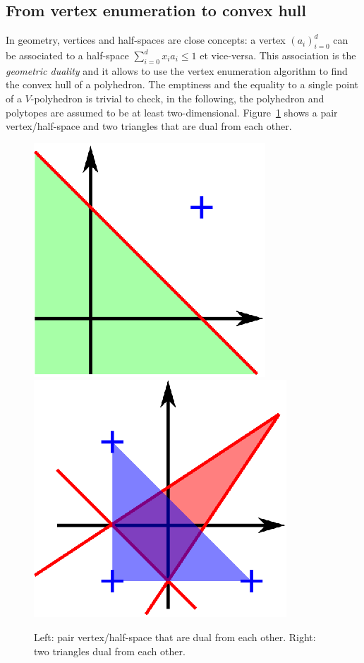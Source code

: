 \subsection{From vertex enumeration to convex hull}


In geometry, vertices and half-spaces are close concepts: a vertex $(a_i)_{i=0}^d$ can be associated to a half-space $\sum_{i=0}^d x_i a_i \leq 1$ et vice-versa. This association is the \emph{geometric duality} and it allows to use the vertex enumeration algorithm to find the convex hull of a polyhedron. The emptiness and the equality to a single point of a $V$-polyhedron is trivial to check, in the following, the polyhedron and polytopes are assumed to be at least two-dimensional. Figure~\ref{ex_dual} shows a pair vertex/half-space and two triangles that are dual from each other.

\begin{figure}
\includegraphics[scale=1]{images/dual.eps}
\includegraphics[scale=1]{images/dual4.eps}
\caption{Left: pair vertex/half-space that are dual from each other. Right: two triangles dual from each other.}
\label{ex_dual}
\end{figure}

